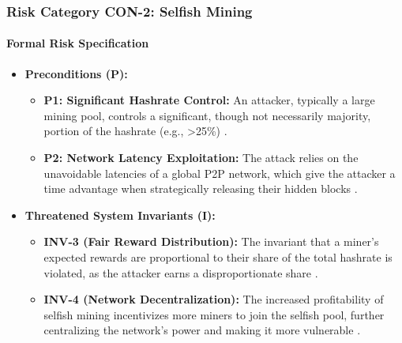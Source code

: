 \subsubsection{Risk Category CON-2: Selfish Mining}

\paragraph{Formal Risk Specification}

\begin{itemize}
    \item \textbf{Preconditions (P):}
    \begin{itemize}
        \item \textbf{P1: Significant Hashrate Control:} An attacker, typically a large mining pool, controls a significant, though not necessarily majority, portion of the hashrate (e.g., >25\%) \cite{Eyal2014}.
        \item \textbf{P2: Network Latency Exploitation:} The attack relies on the unavoidable latencies of a global P2P network, which give the attacker a time advantage when strategically releasing their hidden blocks \cite{Eyal2014, Wang2019}.
    \end{itemize}

    \item \textbf{Threatened System Invariants (I):}
    \begin{itemize}
        \item \textbf{INV-3 (Fair Reward Distribution):} The invariant that a miner's expected rewards are proportional to their share of the total hashrate is violated, as the attacker earns a disproportionate share \cite{Eyal2014}.
        \item \textbf{INV-4 (Network Decentralization):} The increased profitability of selfish mining incentivizes more miners to join the selfish pool, further centralizing the network's power and making it more vulnerable \cite{Eyal2014}.
    \end{itemize}


\end{itemize}
